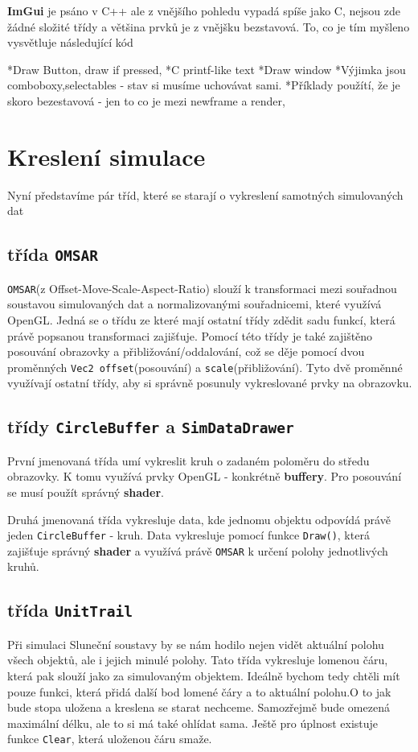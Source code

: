 \textbf{ImGui} je psáno v C++ ale z vnějšího pohledu vypadá spíše jako C, nejsou zde žádné složité třídy a většina prvků je z vnějšku bezstavová. To, co je tím myšleno vysvětluje následující kód

*Draw Button, draw if pressed, 
*C printf-like text
*Draw window
*Výjimka jsou comboboxy,selectables - stav si musíme uchovávat sami.
*Příklady použítí, že je skoro bezestavová - jen to co je mezi newframe a render,

\section{Kreslení simulace}
Nyní představíme pár tříd, které se starají o vykreslení samotných simulovaných dat
\subsection{třída \texttt{OMSAR}}
\texttt{OMSAR}(z Offset-Move-Scale-Aspect-Ratio) slouží k transformaci mezi souřadnou soustavou simulovaných dat a normalizovanými souřadnicemi, které využívá OpenGL. Jedná se o třídu ze které mají ostatní třídy zdědit sadu funkcí, která právě popsanou transformaci zajišťuje. Pomocí této třídy je také zajištěno posouvání obrazovky a přibližování/oddalování, což se děje pomocí dvou proměnných \texttt{Vec2 offset}(posouvání) a \texttt{scale}(přibližování). Tyto dvě proměnné využívají ostatní třídy, aby si správně posunuly vykreslované prvky na obrazovku.
\subsection{třídy \texttt{CircleBuffer} a \texttt{SimDataDrawer}} 
První jmenovaná třída umí vykreslit kruh o zadaném poloměru do středu obrazovky. K tomu využívá prvky OpenGL - konkrétně \textbf{buffery}. Pro posouvání se musí použít správný \textbf{shader}.
 
Druhá jmenovaná třída vykresluje data, kde jednomu objektu odpovídá právě jeden \texttt{CircleBuffer} - kruh. Data vykresluje pomocí funkce \texttt{Draw()}, která zajišťuje správný \textbf{shader} a využívá právě \texttt{OMSAR} k určení polohy jednotlivých kruhů.
\subsection{třída \texttt{UnitTrail}}
Při simulaci Sluneční soustavy by se nám hodilo nejen vidět aktuální polohu všech objektů, ale i jejich minulé polohy. Tato třída vykresluje lomenou čáru, která pak slouží jako  za simulovaným objektem. Ideálně bychom tedy chtěli mít pouze funkci, která přidá další bod lomené čáry a to aktuální polohu.O to jak bude stopa uložena a kreslena se starat nechceme. Samozřejmě bude omezená maximální délku, ale to si má také ohlídat sama. Ještě pro úplnost existuje funkce \texttt{Clear}, která uloženou čáru smaže.

